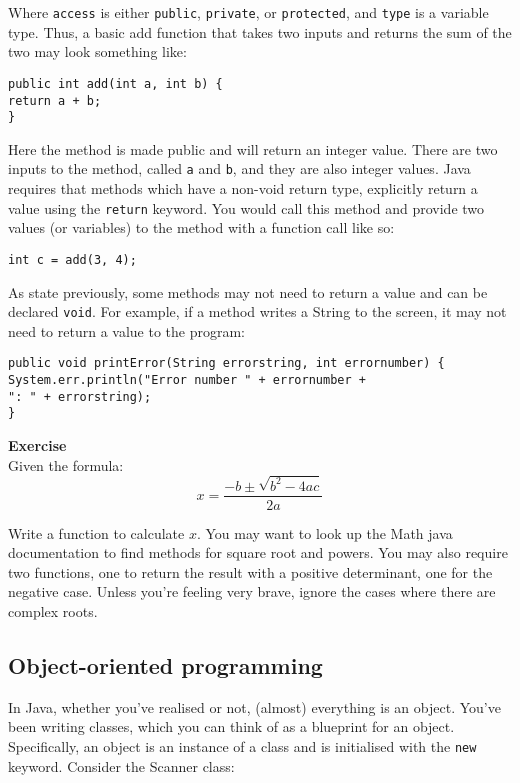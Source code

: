 \noindent
Where {\tt access} is either {\tt public}, {\tt private}, or {\tt protected}, and {\tt type} is a variable type. Thus, a basic add function that takes two inputs and returns the sum of the two may look something like:

\begin{verbatim}
public int add(int a, int b) {
return a + b;
}
\end{verbatim}


\noindent
Here the method is made public and will return an integer value. There are two inputs to the method, called {\tt a} and {\tt b}, and they are also integer values. Java requires that methods which have a non-void return type, explicitly return a value using the {\tt return} keyword. You would call this method and provide two values (or variables) to the method with a function call like so:

\begin{verbatim}
int c = add(3, 4);
\end{verbatim}

\noindent
As state previously, some methods may not need to return a value and can be declared {\tt void}. For example, if a method writes a String to the screen, it may not need to return a value to the program:

\begin{verbatim}
public void printError(String errorstring, int errornumber) {
System.err.println("Error number " + errornumber +
": " + errorstring);
}
\end{verbatim}

\noindent
{\bf Exercise}\\

\noindent
Given the formula:
$$x = \displaystyle\frac{-b \pm \sqrt{b^2 - 4ac}}{2a}$$

\noindent
Write a function to calculate $x$. You may want to look up the Math java documentation to find methods for square root and powers. You may also require two functions, one to return the result with a positive determinant, one for the negative case. Unless you're feeling very brave, ignore the cases where there are complex roots.

\subsection{Object-oriented programming}

In Java, whether you've realised or not, (almost) everything is an object. You've been writing classes, which you can think of as a blueprint for an object. Specifically, an object is an instance of a class and is initialised with the {\tt new} keyword. Consider the Scanner class:

